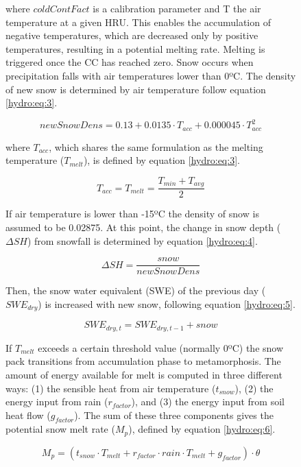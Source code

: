 \begin{figure}[h]
where $coldContFact$ is a calibration parameter and T the air temperature at a given HRU. This enables the accumulation of negative temperatures, which are decreased only by positive temperatures, resulting in a potential melting rate. Melting is triggered once the CC has reached zero. Snow occurs when precipitation falls with air temperatures lower than 0ºC. The density of new snow is determined by air temperature follow equation \ref{hydro:eq:3}.

\begin{equation} \label{hydro:eq:2}
 newSnowDens = 0.13 + 0.0135 \cdot T_{acc} + 0.000045 \cdot T_{acc}^{2}
\end{equation} 
 
where $T_{acc}$, which shares the same formulation as the melting temperature ($T_{melt}$), is defined by equation \ref{hydro:eq:3}.

\begin{equation} \label{hydro:eq:3}
 T_{acc} = T_{melt} = \frac{T_{min} + T_{avg}}{2}
\end{equation} 

If air temperature is lower than -15ºC the density of snow is assumed to be 0.02875. At this point, the change in snow depth ($\Delta SH$) from snowfall is determined by equation \ref{hydro:eq:4}.

\begin{equation} \label{hydro:eq:4}
 \Delta SH = \frac{snow}{newSnowDens}
\end{equation} 

Then, the snow water equivalent (SWE) of the previous day ($SWE_{dry}$) is increased with new snow, following equation \ref{hydro:eq:5}.

\begin{equation} \label{hydro:eq:5}
 SWE_{dry,t} = SWE_{dry,t-1} + snow
\end{equation} 

If $T_{melt}$ exceeds a certain threshold value (normally 0ºC) the snow pack transitions from accumulation phase to metamorphosis. The amount of energy available for melt is computed in three different ways: (1) the sensible heat from air temperature ($t_{snow}$), (2) the energy input from rain ($r_{factor}$), and (3) the energy input from soil heat flow ($g_{factor}$). The sum of these three components gives the potential snow melt rate ($M_{p}$), defined by equation \ref{hydro:eq:6}.

\begin{equation} \label{hydro:eq:6}
 M_{p} = (t_{snow} \cdot T_{melt} + r_{factor} \cdot rain \cdot T_{melt} + g_{factor}) \cdot \theta
\end{equation} 


\end{figure}
